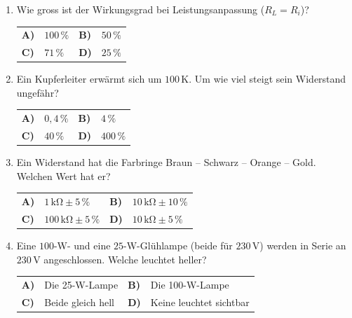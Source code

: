 \documentclass[a4paper,11pt]{article}
\makeatletter
\newif\ifloesung
\newcommand{\loesung}[1]{\ifloesung\par\smallskip\noindent\textcolor{zwetschge}{\textbf{Lösung:} #1}\fi}
\newcommand{\mc}[6]{%
  \item #1\par\nopagebreak\smallskip
  \noindent\begin{tabularx}{\linewidth}{@{}>{\bfseries}l X >{\bfseries}l X@{}}
    A) & #2 & B) & #3 \\[0.25em]
    C) & #4 & D) & #5
  \end{tabularx}%
  \loesung{#6}}
\makeatother
\begin{document}
\begin{enumerate}
  \mc{Wie gross ist der Wirkungsgrad bei Leistungsanpassung ($R_L = R_i$)?}
     {$100\,\%$}{$50\,\%$}{$71\,\%$}{$25\,\%$}
     {B. Die Hälfte der Leistung wird im Innenwiderstand verheizt. Maximale Leistung heisst nicht maximaler Wirkungsgrad.}

  \mc{Ein Kupferleiter erwärmt sich um $100\,\mathrm{K}$. Um wie viel steigt sein Widerstand ungefähr?}
     {$0{,}4\,\%$}{$4\,\%$}{$40\,\%$}{$400\,\%$}
     {C. $\alpha_{Cu} \approx 0{,}0039\,\mathrm{K^{-1}}$, also etwa $+39\,\%$.}

  \mc{Ein Widerstand hat die Farbringe Braun -- Schwarz -- Orange -- Gold. Welchen Wert hat er?}
     {$1\,\mathrm{k\Omega} \pm 5\,\%$}{$10\,\mathrm{k\Omega} \pm 10\,\%$}{$100\,\mathrm{k\Omega} \pm 5\,\%$}{$10\,\mathrm{k\Omega} \pm 5\,\%$}
     {D. 1, 0, $\times 10^3$, Gold $= \pm 5\,\%$ (Silber wäre $\pm 10\,\%$).}

  \mc{Eine $100$-W- und eine $25$-W-Glühlampe (beide für $230\,\mathrm{V}$) werden in Serie an $230\,\mathrm{V}$ angeschlossen. Welche leuchtet heller?}
     {Die 25-W-Lampe}{Die 100-W-Lampe}{Beide gleich hell}{Keine leuchtet sichtbar}
     {A. Die 25-W-Lampe hat den viermal grösseren Widerstand. Bei gleichem Strom fällt an ihr die grössere Leistung $P = I^2R$ ab.}
\end{enumerate}
\end{document}
